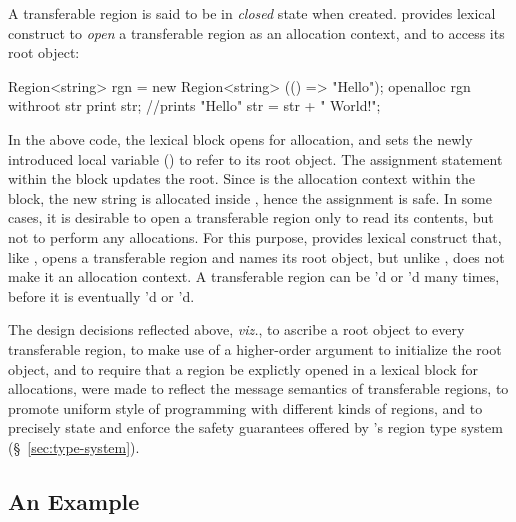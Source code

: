 A transferable region is said to be in \emph{closed} state when
created. \name provides  lexical construct to \emph{open}
a transferable region as an allocation context, and to access its root
object:
\begin{codejava}
  Region<string> rgn = new Region<string>
                        (() => "Hello");
  openalloc rgn withroot str {
    print str; //prints "Hello"
    str = str + " World!"; 
  }
\end{codejava}
In the above code, the  lexical block opens  for
allocation, and sets the newly introduced local variable () to
refer to its root object.  The assignment statement within the block
updates the root. Since  is the allocation context within the
block, the new string is allocated inside , hence the
assignment is safe. In some cases, it is desirable to open a
transferable region only to read its contents, but not to perform any
allocations. For this purpose, \name provides  lexical
construct that, like , opens a transferable region and
names its root object, but unlike , does not make it an
allocation context. A transferable region can be 'd or
'd many times, before it is eventually 'd or
'd.

The design decisions reflected above, \emph{viz.}, to ascribe a root
object to every transferable region, to make use of a higher-order
argument to initialize the root object, and to require that a region
be explictly opened in a lexical block for allocations, were made to
reflect the message semantics of transferable regions, to promote
uniform style of programming with different kinds of regions, and to
precisely state and enforce the safety guarantees offered by \name's
region type system (\S~\ref{sec:type-system}).



\subsection{An Example}

